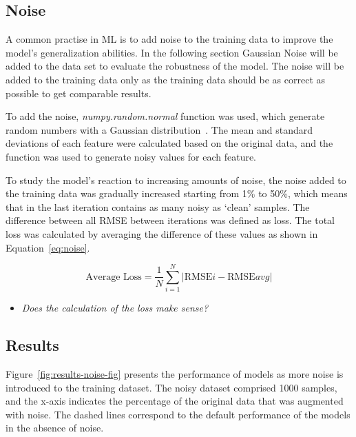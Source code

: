 \subsection{Noise}\label{subsec:noise}
A common practise in \ac{ML} is to add noise to the training data to improve
the model's generalization abilities.
In the following section Gaussian Noise will be added to the data set to evaluate the robustness
of the model.
The noise will be added to the training data only as the training data should be as correct as possible to get
comparable results.

To add the noise, \textit{numpy.random.normal} function was used, which
generate random numbers with a Gaussian distribution~\cite{scikit-learn}.
The mean and standard deviations of each feature were calculated based on the original data, and the function was
used to generate noisy values for each feature.

To study the model's reaction to increasing amounts of noise, the noise added
to the training data was gradually increased starting from 1\% to 50\%, which means that in the
last iteration contains as many noisy as `clean' samples.
The difference between all \ac{RMSE} between iterations was defined as loss.
The total loss was calculated by averaging the difference of these values as shown in Equation~\ref{eq:noise}.

\begin{tcolorbox}[arc=0pt,boxrule=0.5pt]
    \begin{equation}
        \text{Average Loss} = \frac{1}{N} \sum_{i=1}^{N} |\text{RMSE}i -
        \text{RMSE}{avg}|\label
        {eq:noise}
    \end{equation}
\end{tcolorbox}

\begin{itemize}
    \item \textit{Does the calculation of the loss make sense?}
\end{itemize}

\subsection{Results}\label{subsec:results-robustness}


Figure~\ref{fig:results-noise-fig} presents the performance of models as more noise is introduced to the training
dataset. The noisy dataset comprised 1000 samples, and the x-axis indicates the percentage of the original data that
was augmented with noise. The dashed lines correspond to the default performance of the models in the absence of noise.

